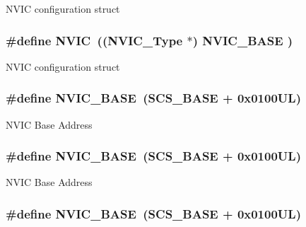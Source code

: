 N\-V\-I\-C configuration struct \hypertarget{group___c_m_s_i_s__core__base_gac8e97e8ce56ae9f57da1363a937f8a17}{
\subsubsection[{N\-V\-I\-C}]{\setlength{\rightskip}{0pt plus 5cm}\#define N\-V\-I\-C~(({\bf N\-V\-I\-C\-\_\-\-Type}      $\ast$)     {\bf N\-V\-I\-C\-\_\-\-B\-A\-S\-E}     )}}\label{group___c_m_s_i_s__core__base_gac8e97e8ce56ae9f57da1363a937f8a17}
N\-V\-I\-C configuration struct \hypertarget{group___c_m_s_i_s__core__base_gaa0288691785a5f868238e0468b39523d}{
\subsubsection[{N\-V\-I\-C\-\_\-\-B\-A\-S\-E}]{\setlength{\rightskip}{0pt plus 5cm}\#define N\-V\-I\-C\-\_\-\-B\-A\-S\-E~({\bf S\-C\-S\-\_\-\-B\-A\-S\-E} +  0x0100\-U\-L)}}\label{group___c_m_s_i_s__core__base_gaa0288691785a5f868238e0468b39523d}
N\-V\-I\-C Base Address \hypertarget{group___c_m_s_i_s__core__base_gaa0288691785a5f868238e0468b39523d}{
\subsubsection[{N\-V\-I\-C\-\_\-\-B\-A\-S\-E}]{\setlength{\rightskip}{0pt plus 5cm}\#define N\-V\-I\-C\-\_\-\-B\-A\-S\-E~({\bf S\-C\-S\-\_\-\-B\-A\-S\-E} +  0x0100\-U\-L)}}\label{group___c_m_s_i_s__core__base_gaa0288691785a5f868238e0468b39523d}
N\-V\-I\-C Base Address \hypertarget{group___c_m_s_i_s__core__base_gaa0288691785a5f868238e0468b39523d}{
\subsubsection[{N\-V\-I\-C\-\_\-\-B\-A\-S\-E}]{\setlength{\rightskip}{0pt plus 5cm}\#define N\-V\-I\-C\-\_\-\-B\-A\-S\-E~({\bf S\-C\-S\-\_\-\-B\-A\-S\-E} +  0x0100\-U\-L)}}\label{group___c_m_s_i_s__core__base_gaa0288691785a5f868238e0468b39523d}
